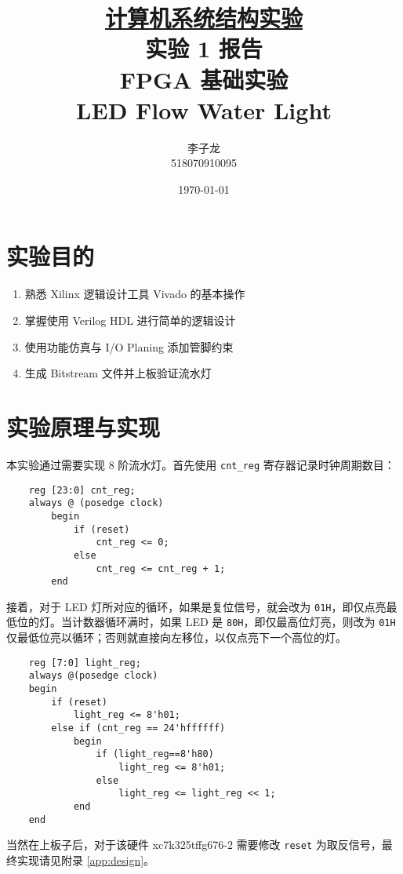 \documentclass[a4paper,UTF8]{ctexart}
\begin{document}
\title{\normalsize \underline{计算机系统结构实验}\\\LARGE 实验 1 报告\\\vspace*{1em}\normalsize FPGA 基础实验 \\ LED Flow Water Light}
\author{李子龙\\ 518070910095}
\date{\today}
\maketitle
\tableofcontents
\clearpage

\section{实验目的}

\begin{enumerate}
    \item 熟悉 Xilinx 逻辑设计工具 Vivado 的基本操作
    \item 掌握使用 Verilog HDL 进行简单的逻辑设计
    \item 使用功能仿真与 I/O Planing 添加管脚约束
    \item 生成 Bitstream 文件并上板验证流水灯
\end{enumerate}

\section{实验原理与实现}

本实验通过需要实现 8 阶流水灯。首先使用 \verb"cnt_reg" 寄存器记录时钟周期数目：

\begin{lstlisting}
    reg [23:0] cnt_reg;
    always @ (posedge clock)
        begin
            if (reset)
                cnt_reg <= 0;
            else
                cnt_reg <= cnt_reg + 1;
        end
\end{lstlisting}

接着，对于 LED 灯所对应的循环，如果是复位信号，就会改为 \verb"01H"，即仅点亮最低位的灯。当计数器循环满时，如果 LED 是 \verb"80H"，即仅最高位灯亮，则改为 \verb"01H" 仅最低位亮以循环；否则就直接向左移位，以仅点亮下一个高位的灯。

\begin{lstlisting}
    reg [7:0] light_reg;
    always @(posedge clock) 
    begin
        if (reset) 
            light_reg <= 8'h01;
        else if (cnt_reg == 24'hffffff)
            begin
                if (light_reg==8'h80)
                    light_reg <= 8'h01;
                else
                    light_reg <= light_reg << 1;
            end
    end
\end{lstlisting}
当然在上板子后，对于该硬件 xc7k325tffg676-2 需要修改 \verb"reset" 为取反信号，最终实现请见附录 \ref{app:design}。
\end{document}
